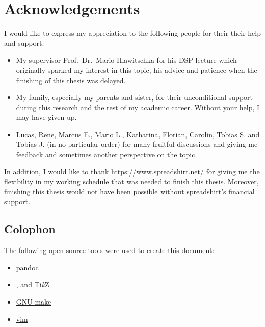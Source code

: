 \chapter*{Acknowledgements}

I would like to express my appreciation to the following people for their their help and support:

\begin{itemize}
\item My supervisor Prof.~Dr.~Mario Hlawitschka for his DSP lecture which originally sparked my interest in this topic, his advice and patience when the finishing of this thesis was delayed.
\item My family, especially my parents and sister, for their unconditional support during this research and the rest of my academic career. Without your help, I may have given up.
\item Lucas, Rene, Marcus E., Mario L., Katharina, Florian, Carolin, Tobias S. and Tobias J. (in no particular order) for many fruitful discussions and giving me feedback and sometimes another perspective on the topic.
\end{itemize}

In addition, I would like to thank \href{spreadshirt}{https://www.spreadshirt.net/} for giving me the flexibility in my working schedule that was needed to finish this thesis.
Moreover, finishing this thesis would not have been possible without spreadshirt's financial support.

\section*{Colophon}

The following open-source tools were used to create this document:

\begin{itemize}
\item \href{https://pandoc.org}{pandoc}
\item \LaTeXe{}, \XeLaTeX{} and Ti\textit{k}Z
\item \href{https://www.gnu.org/software/make}{GNU make}
\item \href{https://www.vim.org}{vim}
\end{itemize}
